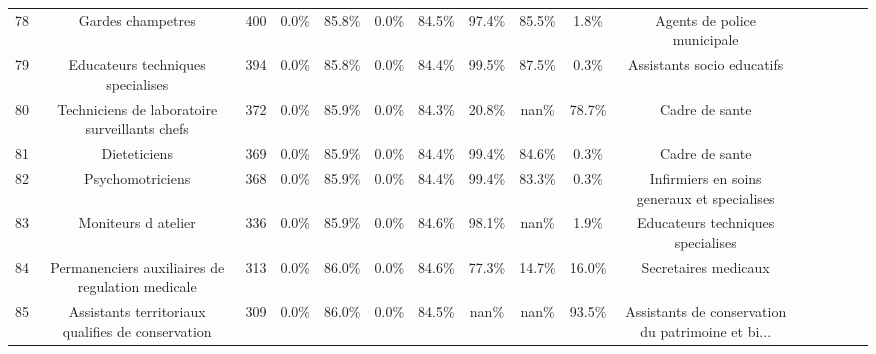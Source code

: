 \documentclass[10pt]{article}
\begin{document}
\begin{landscape}
\begin{longtable}{ | p{0.5cm} |*{15}{c|} }
78  &                                  Gardes champetres &            400 &           0.0\% &                  85.8\% &                 0.0\% &                    84.5\% &              97.4\% &                             85.5\% &                                     1.8\% &                        Agents de police municipale \\
79  &                  Educateurs techniques specialises &            394 &           0.0\% &                  85.8\% &                 0.0\% &                    84.4\% &              99.5\% &                             87.5\% &                                     0.3\% &                         Assistants socio educatifs \\
80  &      Techniciens de laboratoire surveillants chefs &            372 &           0.0\% &                  85.9\% &                 0.0\% &                    84.3\% &              20.8\% &                              nan\% &                                    78.7\% &                                     Cadre de sante \\
81  &                                       Dieteticiens &            369 &           0.0\% &                  85.9\% &                 0.0\% &                    84.4\% &              99.4\% &                             84.6\% &                                     0.3\% &                                     Cadre de sante \\
82  &                                   Psychomotriciens &            368 &           0.0\% &                  85.9\% &                 0.0\% &                    84.4\% &              99.4\% &                             83.3\% &                                     0.3\% &        Infirmiers en soins generaux et specialises \\
83  &                                Moniteurs d atelier &            336 &           0.0\% &                  85.9\% &                 0.0\% &                    84.6\% &              98.1\% &                              nan\% &                                     1.9\% &                  Educateurs techniques specialises \\
84  &   Permanenciers auxiliaires de regulation medicale &            313 &           0.0\% &                  86.0\% &                 0.0\% &                    84.6\% &              77.3\% &                             14.7\% &                                    16.0\% &                               Secretaires medicaux \\
85  &  Assistants territoriaux qualifies de conservation &            309 &           0.0\% &                  86.0\% &                 0.0\% &                    84.5\% &               nan\% &                              nan\% &                                    93.5\% &  Assistants de conservation du patrimoine et bi... \\

\end{longtable}
\end{landscape}
\end{document}
